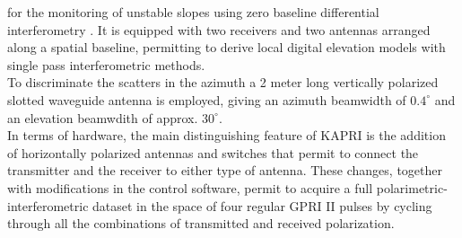 for the monitoring of unstable slopes using zero baseline differential interferometry \cite{Massonnet1993,JGRB:JGRB7093}. It is equipped with two receivers and two antennas arranged along a spatial baseline, permitting to derive local digital elevation models with single pass interferometric methods.\\
To discriminate the scatters in the azimuth a 2 meter long vertically polarized slotted waveguide antenna is employed, giving an azimuth beamwidth of $0.4^\circ$ and an elevation beamwdith of approx. $30^\circ$.\\
In terms of hardware, the main distinguishing feature of KAPRI is the addition of horizontally polarized antennas and switches that permit to connect the transmitter and the receiver to either type of antenna. These changes, together with modifications in the control software, permit to acquire a full polarimetric-interferometric dataset in the space of four regular GPRI II pulses by cycling through all the combinations of transmitted and received polarization.
